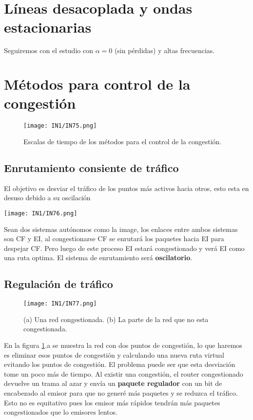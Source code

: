 \documentclass[12pt,fleqn,a4paper,oneside]{LegrandOrangeBook}
\begin{document}
\section{Líneas desacoplada y ondas estacionarias}
Seguiremos con el estudio con $\alpha=0$ (sin pérdidas) y altas frecuencias.
\section{Métodos para control de la congestión}
\begin{figure}[H]
\centering
\texttt{[image: IN1/IN75.png]}
\caption{Escalas de tiempo de los métodos para el control de la congestión.}
\end{figure}
\subsection{Enrutamiento consiente de tráfico}
El objetivo es desviar el tráfico de los puntos más activos hacia otros, esto esta en desuso debido a su oscilación
\begin{center}
\texttt{[image: IN1/IN76.png]}
\end{center}
Sean dos sistemas autónomos como la image, los enlaces entre ambos sistemas son CF y EI, al congestionarse CF se enrutará los paquetes hacia EI para despejar CF. Pero luego de este proceso EI estará congestionado y verá EI como una ruta optima. El sistema de enrutamiento será \textbf{oscilatorio}.
\subsection{Regulación de tráfico}
\begin{figure}[H]
\centering
\texttt{[image: IN1/IN77.png]}
\caption{(a) Una red congestionada. (b) La parte de la red que no esta congestionada.}
\label{fig:regulacion trafico}
\end{figure}
En la figura \ref{fig:regulacion trafico}.a se muestra la red con dos puntos de congestión, lo que haremos es eliminar esos puntos de congestión y calculando una nueva ruta virtual evitando los puntos de congestión. El problema puede ser que esta desviación tome un poco más de tiempo. Al existir una congestión, el router congestionado devuelve un trama al azar y envía un \textbf{paquete regulador} con un bit de encabezado al emisor para que no generé más paquetes y se reduzca el tráfico. Esto no es equitativo pues los emisor más rápidos tendrán más paquetes congestionados que lo emisores lentos.
\end{document}

